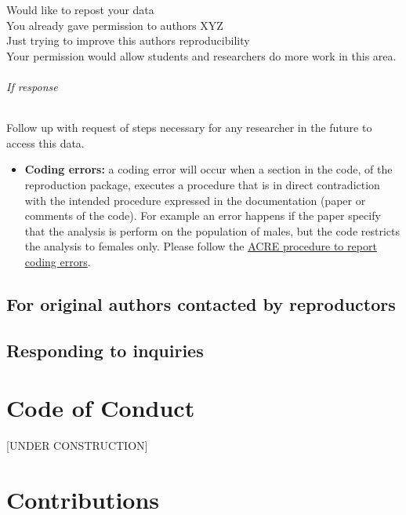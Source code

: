 \documentclass[]{book}
\providecommand{\tightlist}{%
  \setlength{\itemsep}{0pt}\setlength{\parskip}{0pt}}
\let\oldsubparagraph\subparagraph
\renewcommand{\subparagraph}[1]{\oldsubparagraph{#1}\mbox{}}
\begin{document}
Would like to repost your data\\
You already gave permission to authors XYZ\\
Just trying to improve this authors reproducibility\\
Your permission would allow students and researchers do more work in this area.

\hypertarget{if-response}{%
\subparagraph{If response}\label{if-response}}

Follow up with request of steps necessary for any researcher in the future to access this data.

\begin{itemize}
\tightlist
\item
  \textbf{Coding errors:} a coding error will occur when a section in the code, of the reproduction package, executes a procedure that is in direct contradiction with the intended procedure expressed in the documentation (paper or comments of the code). For example an error happens if the paper specify that the analysis is perform on the population of males, but the code restricts the analysis to females only. Please follow the \href{ADD\%20LINK}{ACRE procedure to report coding errors}.
\end{itemize}

\hypertarget{for-original-authors-contacted-by-reproductors}{%
\section{For original authors contacted by reproductors}\label{for-original-authors-contacted-by-reproductors}}

\hypertarget{responding-to-inquiries}{%
\section{Responding to inquiries}\label{responding-to-inquiries}}

\hypertarget{code-of-conduct}{%
\chapter{Code of Conduct}\label{code-of-conduct}}

{[}UNDER CONSTRUCTION{]}

\hypertarget{contributions}{%
\chapter{Contributions}\label{contributions}}
\end{document}
